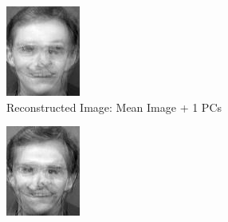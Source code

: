 \documentclass[12pt]{article}
\begin{document}
\begin{figure}
\begin{subfigure}[b]{0.20\textwidth}
		\includegraphics[width=\textwidth]{Task4.6_Images/ReconstructedImage1.jpg}
		\caption{Reconstructed Image: Mean Image + 1 PCs}
	\end{subfigure}\quad
	\begin{subfigure}[b]{0.20\textwidth}
		\includegraphics[width=\textwidth]{Task4.6_Images/ReconstructedImage2.jpg}

\end{subfigure}
\end{figure}
\end{document}
